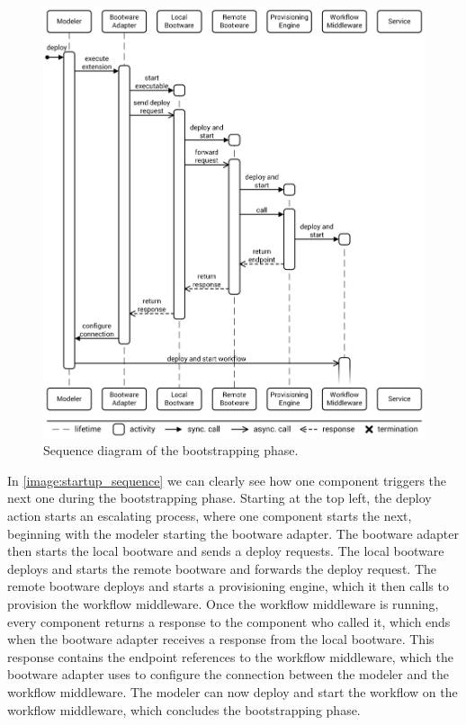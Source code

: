 \begin{figure}[!htbp]
	\centering
	\includegraphics[resolution=600]{process/assets/bootstrapping_sequence}
	\caption{Sequence diagram of the bootstrapping phase.}
	\label{image:startup_sequence}
\end{figure}

In \autoref{image:startup_sequence} we can clearly see how one component triggers the next one during the bootstrapping phase.
Starting at the top left, the deploy action starts an escalating process, where one component starts the next, beginning with the modeler starting the bootware adapter.
The bootware adapter then starts the local bootware and sends a deploy requests.
The local bootware deploys and starts the remote bootware and forwards the deploy request.
The remote bootware deploys and starts a provisioning engine, which it then calls to provision the workflow middleware.
Once the workflow middleware is running, every component returns a response to the component who called it, which ends when the bootware adapter receives a response from the local bootware.
This response contains the endpoint references to the workflow middleware, which the bootware adapter uses to configure the connection between the modeler and the workflow middleware.
The modeler can now deploy and start the workflow on the workflow middleware, which concludes the bootstrapping phase.

